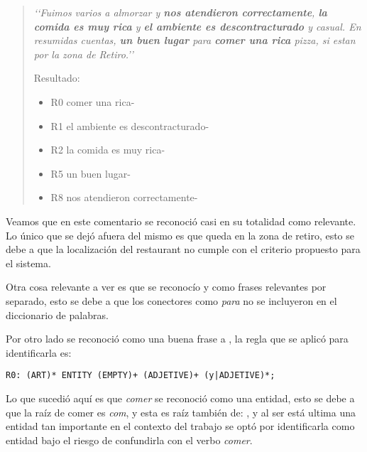 \begin{quotation}

\emph{
\lq{}\lq{}Fuimos varios a almorzar y {\bf nos atendieron correctamente}, {\bf la comida es muy rica} y {\bf el ambiente es descontracturado} y casual.  En resumidas cuentas, {\bf un buen lugar} para {\bf comer una rica} pizza, si estan por la zona de Retiro.\rq{}\rq{}
}


Resultado:
\begin{itemize}
\item R0  comer una rica-
\item R1  el ambiente es descontracturado-
\item R2  la comida es muy rica-
\item R5  un buen lugar-
\item R8  nos atendieron correctamente-
\end{itemize}

\end{quotation}

Veamos que en este comentario se reconoció casi en su totalidad como relevante. Lo único que se dejó afuera del mismo es que queda en la zona de retiro, esto se debe a que la localización del restaurant no cumple con el criterio propuesto para el sistema.

Otra cosa relevante a ver es que se reconocío  y  como frases relevantes por separado, esto se debe a que los conectores como \emph{para} no se incluyeron en el diccionario de palabras.

Por otro lado se reconoció como una buena frase a , la regla que se aplicó para identificarla es:

\begin{verbatim}
R0: (ART)* ENTITY (EMPTY)+ (ADJETIVE)+ (y|ADJETIVE)*;
\end{verbatim}

Lo que sucedió aquí es que \emph{comer} se reconoció como una entidad, esto se debe a que la raíz de comer es \emph{com}, y esta es raíz también de: , y al ser está ultima una entidad tan importante en el contexto del trabajo se optó por identificarla como entidad bajo el riesgo de confundirla con el verbo \emph{comer}.